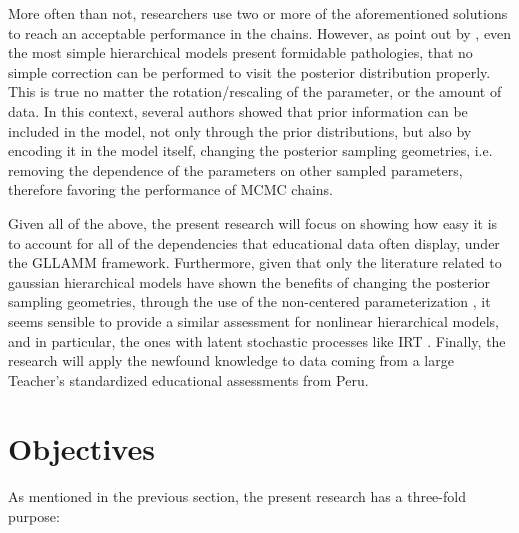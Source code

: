 More often than not, researchers use two or more of the aforementioned solutions to reach an acceptable performance in the chains. However, as point out by \citet{Betancourt_et_al_2013}, even the most simple hierarchical models present formidable pathologies, that no simple correction can be performed to visit the posterior distribution properly. This is true no matter the rotation/rescaling of the parameter, or the amount of data. In this context, several authors \cite{Gelfand_et_al_1995, Gelfand_et_al_1996, Papaspiliopoulos_et_al_2003, Papaspiliopoulos_et_al_2007, Betancourt_et_al_2013} showed that prior information can be included in the model, not only through the prior distributions, but also by encoding it in the model itself, changing the posterior sampling geometries, i.e. removing the dependence of the parameters on other sampled parameters, therefore favoring the performance of MCMC chains.

Given all of the above, the present research will focus on showing how easy it is to account for all of the dependencies that educational data often display, under the GLLAMM framework. Furthermore,  given that only the literature related to gaussian hierarchical models have shown the benefits of changing the posterior sampling geometries, through the use of the non-centered parameterization \cite{Gelfand_et_al_1995, Gelfand_et_al_1996, Papaspiliopoulos_et_al_2003, Papaspiliopoulos_et_al_2007, Betancourt_et_al_2013}, it seems sensible to provide a similar assessment for nonlinear hierarchical models, and in particular, the ones with latent stochastic processes like IRT \cite{Papaspiliopoulos_et_al_2007}. Finally, the research will apply the newfound knowledge to data coming from a large Teacher's standardized educational assessments from Peru.


\section{Objectives}

As mentioned in the previous section, the present research has a three-fold purpose:

